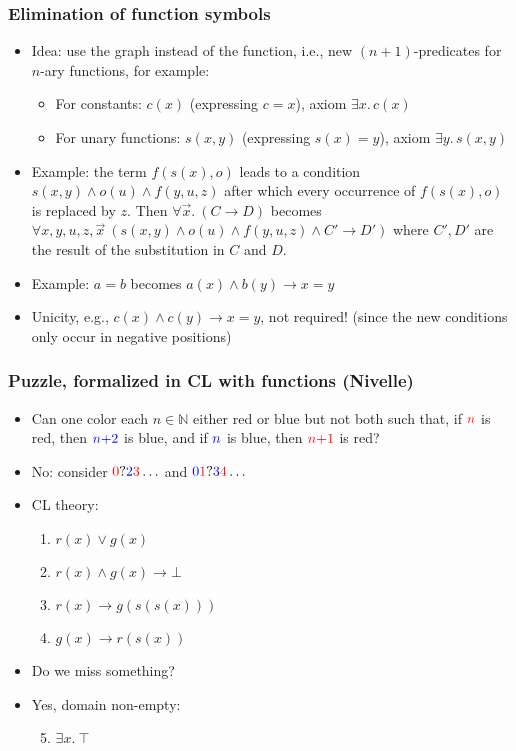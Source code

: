 \documentclass[handout,11pt]{beamer}
\newcommand{\blue}[1]{\textcolor{blue}{#1}}
\newcommand{\red}[1]{\textcolor{red}{#1}}
\newcommand{\nat}{\mathbb{N}}
\newcommand{\imp}{\rightarrow}
\begin{document}
\begin{frame}
\frametitle{Elimination of function symbols}
 \begin{itemize}[<+->]
  \item Idea: use the graph instead of the function, i.e.,
  new $(n{+}1)$-predicates for $n$-ary functions, for example:
   \begin{itemize}[<+->]
    \item For constants: $c(x)$ (expressing $c=x$), 
     axiom $\exists x.\,c(x)$
    \item For unary functions: 
    $s(x,y)$ (expressing $s(x)=y$), axiom $\exists y.\,s(x,y)$
   \end{itemize} 
   \item Example: the term $f(s(x),o)$ leads to a condition
   $s(x,y)\land o(u)\land f(y,u,z)$ after which every occurrence of
   $f(s(x),o)$ is replaced by $z$. Then $\forall\vec{x}.~(C \to D)$ becomes 
   $\forall x,y,u,z,\vec{x}~(s(x,y)\land o(u)\land f(y,u,z)\land C'\to D')$ 
   where $C',D'$ are the result of the substitution in $C$ and $D$.
   \item Example: $a=b$ becomes $a(x) \land b(y) \to x=y$
   \item Unicity, e.g., $c(x)\land c(y)\to x=y$, \alert{not} required!
   (since the new conditions only occur in negative positions)
 \end{itemize}
\end{frame}

\begin{frame}
\frametitle{Puzzle, formalized in CL with functions (Nivelle)} 
 \begin{itemize}[<+->]
     \item Can one color each
     $n\in\nat$ either red or blue but not both such that, 
     if $\red{n}$ is red, then $\blue{n{+}2}$ is blue, 
     and if  $\blue{n}$ is blue, then $\red{n{+}1}$ is red?
    \item No: consider $\red{0}?\blue{2}\red{3}\ldots$
    and $\blue{0}\red{1}?\blue{3}\red{4}\ldots$
    \item CL theory:
    \begin{enumerate}
       \item $r(x) \vee g(x)$ 
       \item $r(x) \wedge g(x) \imp \bot$
       \item $r(x) \imp g(s(s(x)))$ 
       \item $g(x) \imp r(s(x))$
     \end{enumerate}
   \item Do we miss something?
   \item Yes, domain non-empty: 
    \begin{enumerate}       
       \setcounter{enumi}{4}       
       \item $\exists x.~\top$
    \end{enumerate}
 \end{itemize}
\end{frame}
\end{document}
